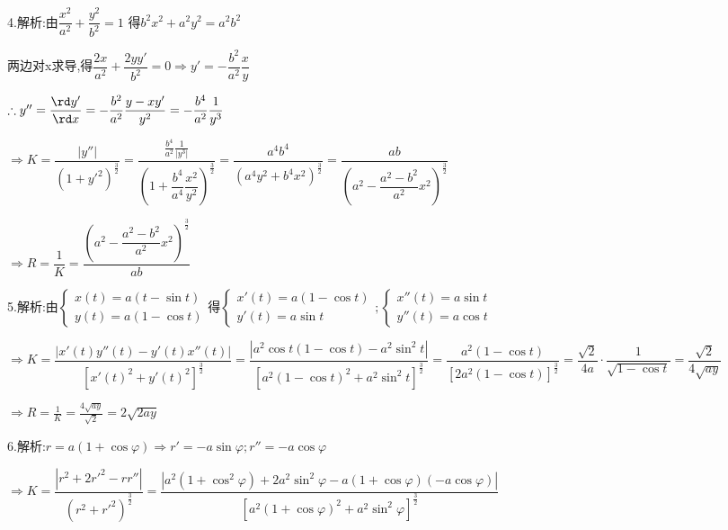 4.解析:由$\dfrac{{{x^2}}}{{{a^2}}} + \dfrac{{{y^2}}}{{{b^2}}} = 1$
得${b^2}{x^2} + {a^2}{y^2} = {a^2}{b^2}$

两边对x求导,得$\dfrac{{2x}}{{{a^2}}} + \dfrac{{2yy'}}{{{b^2}}} = 0 \Rightarrow y' =  - \dfrac{{{b^2}}}{{{a^2}}}\dfrac{x}{y}$

$\therefore y'' = \dfrac{{\rd y'}}{{\rd x}} =  - \dfrac{{{b^2}}}{{{a^2}}}\dfrac{{y - xy'}}{{{y^2}}} =  - \dfrac{{{b^4}}}{{{a^2}}}\dfrac{1}{{{y^3}}}$

$ \Rightarrow K = \dfrac{{|y''|}}{{{{(1 + {{y'}^2})}^{\frac{3}{2}}}}} = \dfrac{{\frac{{{b^4}}}{{{a^2}}}\frac{1}{{|{y^3}|}}}}{{{{(1 + \dfrac{{{b^4}}}{{{a^4}}}\dfrac{{{x^2}}}{{{y^2}}})}^{\frac{3}{2}}}}} = \dfrac{{{a^4}{b^4}}}{{{{({a^4}{y^2} + {b^4}{x^2})}^{\frac{3}{2}}}}} = \dfrac{{ab}}{{{{({a^2} - \dfrac{{{a^2} - {b^2}}}{{{a^2}}}{x^2})}^{\frac{3}{2}}}}}$

$ \Rightarrow R = \dfrac{1}{K} = \dfrac{{{{({a^2} - \dfrac{{{a^2} - {b^2}}}{{{a^2}}}{x^2})}^{\frac{3}{2}}}}}{{ab}}$

5.解析:由$\left\{ \begin{array}{l}
x(t) = a(t - \sin t)\\
y(t) = a(1 - \cos t)
\end{array} \right.得\left\{ \begin{array}{l}
x'(t) = a(1 - \cos t)\\
y'(t) = a\sin t
\end{array} \right.;\left\{ \begin{array}{l}
x''(t) = a\sin t\\
y''(t) = a\cos t
\end{array} \right.$

$ \Rightarrow K = \dfrac{{|x'(t)y''(t) - y'(t)x''(t)|}}{{{{\left[ {x'{{(t)}^2} + y'{{(t)}^2}} \right]}^{\frac{3}{2}}}}} = \dfrac{{|{a^2}\cos t(1 - \cos t) - {a^2}{{\sin }^2}t|}}{{{{\left[ {{a^2}{{(1 - \cos t)}^2} + {a^2}{{\sin }^2}t} \right]}^{\frac{3}{2}}}}} = \dfrac{{{a^2}(1 - \cos t)}}{{{{\left[ {2{a^2}(1 - \cos t)} \right]}^{\frac{3}{2}}}}} = \dfrac{{\sqrt 2 }}{{4a}} \cdot \dfrac{1}{{\sqrt {1 - \cos t} }} = \dfrac{{\sqrt 2 }}{{4\sqrt {ay} }}$

$ \Rightarrow R = \frac{1}{K} = \frac{{4\sqrt {ay} }}{{\sqrt 2 }} = 2\sqrt {2ay} $

6.解析:$r = a(1 + \cos \varphi ) \Rightarrow r' =  - a\sin \varphi ;r'' =  - a\cos \varphi $

$  \Rightarrow K = \dfrac{{|{r^2} + 2{{r'}^2} - rr''|}}{{{{({r^2} + {{r'}^2})}^{\frac{3}{2}}}}} = \dfrac{{|{a^2}(1 + {{\cos }^2}\varphi ) + 2{a^2}{{\sin }^2}\varphi  - a(1 + \cos \varphi )( - a\cos \varphi )|}}{{{{\left[ {{a^2}{{(1 + \cos \varphi )}^2} + {a^2}{{\sin }^2}\varphi } \right]}^{\frac{3}{2}}}}}$

